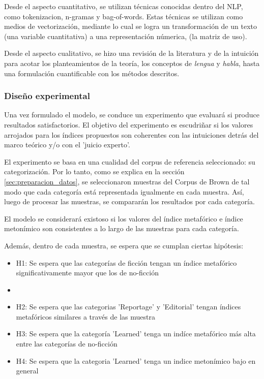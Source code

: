 \documentclass[twoside]{article}
\begin{document}
Desde el aspecto cuantitativo, se utilizan técnicas conocidas
dentro del NLP, como tokenizacion, n-gramas y  bag-of-words.
Estas técnicas se utilizan como medios de vectorización, mediante
lo cual se logra un transformación de un texto (una variable cuantitativa)
a una representación númerica, (la matriz de uso).

Desde el aspecto cualitativo, se hizo una revisión de la literatura y de la intuición
para acotar los planteamientos de la teoría, los conceptos de \emph{lengua} y \emph{habla}, hasta
una formulación cuantificable con los métodos descritos.




\subsubsection{Diseño experimental}
\label{sec:orge4a3a17}

Una vez formulado el modelo, se conduce un experimento que evaluará si produce resultados
satisfactorios. El objetivo del experimento es escudriñar si los valores arrojados para
los índices propuestos son coherentes con las intuiciones detrás del marco teórico y/o
con el 'juicio experto'.

El experimento se basa en una cualidad del corpus de referencia seleccionado: su categorización.
Por lo tanto, como se explica en la sección \ref{sec:preparacion_datos}, se seleccionaron
muestras del Corpus de Brown  de tal modo que cada categoría está representada igualmente
en cada muestra. Así, luego de procesar las muestras, se compararán los resultados por
cada categoría.

El modelo se considerará existoso si los valores del índice metafórico e índice metonímico
son consistentes a lo largo de las muestras para cada categoría.

Además, dentro de cada muestra, se espera que se cumplan ciertas hipótesis:

\begin{itemize}
\item H1: Se espera que las categorías de ficción tengan un índice metafórico significativamente mayor que los de no-ficción
\item 

\item H2: Se espera que las categorias 'Reportage' y 'Editorial' tengan índices metafóricos similares a través de las muestra
\item H3: Se espera que la categoría 'Learned' tenga un indíce metafórico más alta entre las categorías de no-ficción
\item H4: Se espera que la categoria 'Learned' tenga un indice metonímico bajo en general
\end{itemize}
\end{document}
